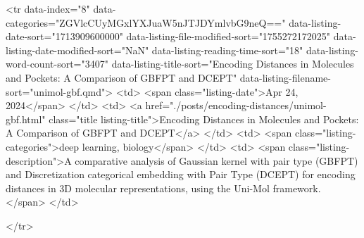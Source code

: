 <tr data-index="8" data-categories="ZGVlcCUyMGxlYXJuaW5nJTJDYmlvbG9neQ==" data-listing-date-sort="1713909600000" data-listing-file-modified-sort="1755272172025" data-listing-date-modified-sort="NaN" data-listing-reading-time-sort="18" data-listing-word-count-sort="3407" data-listing-title-sort="Encoding Distances in Molecules and Pockets: A Comparison of GBFPT and DCEPT" data-listing-filename-sort="unimol-gbf.qmd">
<td>
<span class="listing-date">Apr 24, 2024</span>
</td>
<td>
<a href="./posts/encoding-distances/unimol-gbf.html" class="title listing-title">Encoding Distances in Molecules and Pockets: A Comparison of GBFPT and DCEPT</a>
</td>
<td>
<span class="listing-categories">deep learning, biology</span>
</td>
<td>
<span class="listing-description">A comparative analysis of Gaussian kernel with pair type (GBFPT) and Discretization categorical embedding with Pair Type (DCEPT) for encoding distances in 3D molecular representations, using the Uni-Mol framework.</span>
</td>

</tr>

